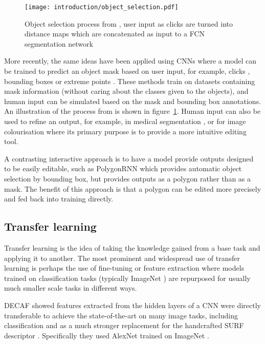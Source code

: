 \begin{figure}[h]
  \centering
  \texttt{[image: introduction/object\_selection.pdf]}
  \caption{Object selection process from \cite{Xu2016b}, user input as clicks are turned into distance maps which are concatenated as input to a \gls{FCN} segmentation network}  
  \label{fig:object_selection}
\end{figure}

More recently, the same ideas have been applied using \gls{CNN}s where a model can be trained to predict an object mask based on user input, for example, clicks \cite{Xu2016b, Boroujerdi2017}, bounding boxes \cite {Xu2017} or extreme points \cite{Maninis2017}. These methods train on datasets containing mask information (without caring about the classes given to the objects), and human input can be simulated based on the mask and bounding box annotations. An illustration of the process from \cite{Xu2016b} is shown in figure~\ref{fig:object_selection}. Human input can also be used to refine an output, for example, in medical segmentation \cite{Wang2017}, or for image colourisation \cite{Zhang} where its primary purpose is to provide a more intuitive editing tool.

A contrasting interactive approach is to have a model provide outputs designed to be easily editable, such as PolygonRNN \cite{Castrejon2017} which provides automatic object selection by bounding box, but provides outputs as a polygon rather than as a mask. The benefit of this approach is that a polygon can be edited more precisely and fed back into training directly.


\subsection {Transfer learning}

Transfer learning is the idea of taking the knowledge gained from a base task and applying it to another. The most prominent and widespread use of transfer learning is perhaps the use of fine-tuning or feature extraction where models trained on classification tasks (typically ImageNet \cite{JiaDeng2009}) are repurposed for usually much smaller scale tasks in different ways. 

\gls{DECAF} \cite{Donahue2014} showed features extracted from the hidden layers of a \gls{CNN} were directly transferable to achieve the state-of-the-art on many image tasks, including classification and as a much stronger replacement for the handcrafted \gls{SURF} descriptor \cite{bay2006surf}.  Specifically they used AlexNet  \cite{Krizhevsky2012} trained on ImageNet \cite{JiaDeng2009}.

